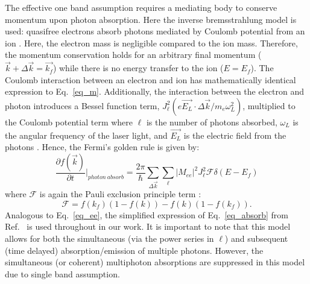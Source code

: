 The effective one band assumption requires a mediating body to conserve momentum upon photon absorption.  Here the inverse bremsstrahlung model is used: quasifree electrons absorb photons mediated by Coulomb potential from an ion \cite{Delone1993,rethfeld}. Here, the electron mass is negligible compared to the ion mass. Therefore, the momentum conservation holds for an arbitrary final momentum ($\vec{k} + \Delta \vec{k} =\vec{k_f}$) while there is no energy transfer to the ion ($E = E_f$). The Coulomb interaction between an electron and ion has mathematically identical expression to Eq.~\ref{eq_m}. Additionally, the interaction between the electron and photon introduces a Bessel function term, $J_\ell^2(e\vec{E_L}\cdot \Delta \vec{k}/m_e \omega_L^2)$, multiplied to the Coulomb potential term where $\ell$ is the number of photons absorbed, $\omega_L$ is the angular frequency of the laser light, and $\vec{E_L}$ is the electric field from the photons \cite{Seely1973}. Hence, the Fermi's golden rule is given by:
\begin{equation}\label{eq_absorb}
	\frac{\partial f(\vec{k})}{\partial t}\biggr|_{photon\: absorb} = \frac{2\pi}{\hbar}\sum_{\Delta\vec{k}}\sum_\ell |M_{ee}|^2 J_\ell^2 \mathcal{F} \delta(E-E_f)
\end{equation}
where $\mathcal{F}$ is again the Pauli exclusion principle term \cite{rethfeld,boltzmann}:
\begin{equation}
	\mathcal{F} = f(k_f)(1-f(k))-f(k)(1-f(k_f)).
\end{equation}
Analogous to Eq.~\ref{eq_ee}, the simplified expression of Eq.~\ref{eq_absorb} from Ref.~\cite{boltzmann} is used throughout in our work. It is important to note that this model allows for both the simultaneous (via the power series in $\ell$) and subsequent (time delayed) absorption/emission of multiple photons. However, the simultaneous (or coherent) multiphoton absorptions are suppressed in this model due to single band assumption.

